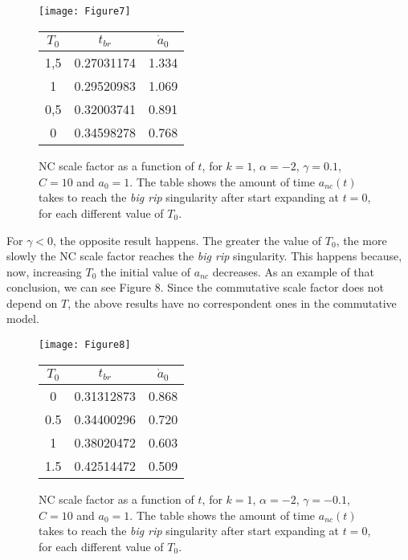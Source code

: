 \documentclass[12pt]{article}
\newcommand{\0}{{(0)}}
\newcommand{\1}{{(1)}}
\newcommand{\2}{{(2)}}
\begin{document}
{\begin{figure}[!htb]
	\centering
	\begin{minipage}[c]{0.49\linewidth}
		\centering
		\texttt{[image: Figure7]}
	\end{minipage}
	\hfill
	\begin{minipage}[c]{0.49\linewidth}
		\centering
		\begin{tabular}{ccc}\hline
			$T_0$ & $t_{br}$ & $\dot{a}_0$ \\ \hline
			1,5 & 0.27031174 & 1.334 \\
			1 & 0.29520983 & 1.069 \\
			0,5 & 0.32003741 & 0.891 \\
			0 & 0.34598278 & 0.768 \\ \hline
		\end{tabular}
	\end{minipage}
	\caption{\footnotesize NC scale factor as a function of $t$, for $k = 1$, $\alpha = -2$, $\gamma = 0.1$, $C = 10$ and $a_0 = 1$.
	The table shows the amount of time $a_{nc}(t)$ takes to reach the {\it big rip} singularity after start expanding at $t=0$, 
		for each different value of $T_0$.}\label{fig7}
\end{figure}

For $\gamma < 0$, the opposite result happens. The greater the value of $T_0$, the more slowly 
the NC scale factor reaches the {\it big rip} singularity. This happens because, now, increasing $T_0$ the initial value of $a_{nc}$ decreases.
As an example of that conclusion, we can see Figure 8. Since the commutative scale factor does not depend on $T$, the above results have no correspondent ones in the commutative model.

\begin{figure}[!htb]
	\centering
	\begin{minipage}[c]{0.49\linewidth}
		\centering
		\texttt{[image: Figure8]}
	\end{minipage}
	\hfill
	\begin{minipage}[c]{0.49\linewidth}
		\centering
		\begin{tabular}{ccc}\hline
			$T_0$ & $t_{br}$ & $\dot{a}_0$ \\ \hline
			0 & 0.31312873 & 0.868 \\		
			0.5 & 0.34400296 & 0.720 \\
			1 & 0.38020472 & 0.603 \\
			1.5 & 0.42514472 & 0.509 \\ \hline
		\end{tabular}
	\end{minipage}
	\caption{\footnotesize NC scale factor as a function of $t$, for $k = 1$, $\alpha = -2$, $\gamma = -0.1$, $C = 10$ and $a_0 = 1$.
	The table shows the amount of time $a_{nc}(t)$ takes to reach the {\it big rip} singularity after start expanding at $t=0$, 
		for each different value of $T_0$.}\label{fig8}
\end{figure}

}
\end{document}
